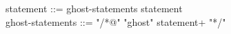 \begin{syntax}
  statement ::= ghost-statements statement \\
  ghost-statements ::= "/*@" "ghost" statement+ "*/"
\end{syntax}

